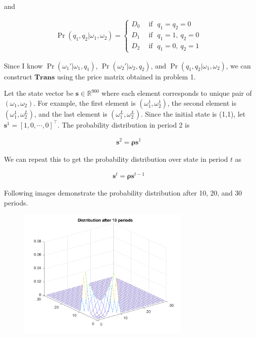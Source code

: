 \documentclass[11pt,letter]{article}
\newcommand{\vect}[1]{\boldsymbol{\mathbf{#1}}}
\newcounter{lem}[section] \setcounter{lem}{0}
\begin{document}
and 

\begin{align*}
\Pr(q_1,q_2 |\omega_1,\omega_2) = 
\begin{cases}
D_0 \ \ &\text{if} \ \ \ q_1=q_2=0\\
D_1 \ \ &\text{if} \ \ \ q_1=1,\ q_2=0 \\
D_2 \ \ &\text{if} \ \ \ q_1=0,\ q_2=1
\end{cases}
\end{align*}

Since I know $\Pr(\omega_1' |\omega_1,q_1)$, $\Pr(\omega_2' |\omega_2,q_2)$, and $\Pr(q_1,q_2 |\omega_1,\omega_2)$, we can construct $\vect{Trans}$ using the price matrix obtained in problem 1.

Let the state vector be $\vect{s}\in\mathbb{R}^{900}$  where each element corresponds to unique pair of $(\omega_1,\omega_2)$. For example, the first element is $(\omega_1^1,\omega_2^1)$, the second element is  $(\omega_1^1,\omega_2^L)$, and the last element is  $(\omega_1^L,\omega_2^L)$. Since the initial state is (1,1), let $\vect{s}^1 = [1,0,\cdots,0]^\top$. The probability distribution in period 2 is

\begin{align*}
\vect{s}^2 = \vect{\rho}\vect{s}^1
\end{align*}

We can repeat this to get the probability distribution over state in period $t$ as

\begin{align*}
\vect{s}^t = \vect{\rho}\vect{s}^{t-1}
\end{align*}

Following images demonstrate the probability distribution after 10, 20, and 30 periods.


\begin{figure}[h]
\begin{center}
\includegraphics[width=0.75\textwidth]{10period.png}
\end{center}
\end{figure}
\end{document}
